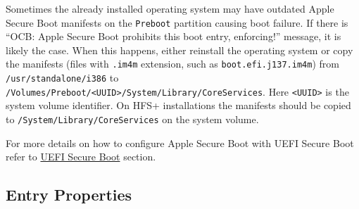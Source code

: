 \documentclass[]{article}
\begin{document}
\begin{enumerate}
  Sometimes the already installed operating system may have outdated Apple Secure
  Boot manifests on the \texttt{Preboot} partition causing boot failure. If there is
  ``OCB: Apple Secure Boot prohibits this boot entry, enforcing!'' message,
  it is likely the case. When this happens, either reinstall the operating
  system or copy the manifests (files with \texttt{.im4m} extension, such as
  \texttt{boot.efi.j137.im4m}) from \texttt{/usr/standalone/i386} to
  \texttt{/Volumes/Preboot/<UUID>/System/Library/CoreServices}. Here \texttt{<UUID>}
  is the system volume identifier. On HFS+ installations the manifests should be
  copied to \texttt{/System/Library/CoreServices} on the system volume.

  For more details on how to configure Apple Secure Boot with UEFI Secure Boot
  refer to \hyperref[uefisecureboot]{UEFI Secure Boot} section.

\end{enumerate}

\subsection{Entry Properties}\label{miscentryprops}
\end{document}
